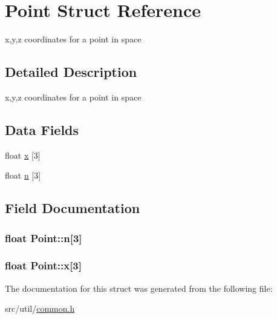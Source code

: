 \hypertarget{struct_point}{}\section{Point Struct Reference}
\label{struct_point}


x,y,z coordinates for a point in space  




\subsection{Detailed Description}
x,y,z coordinates for a point in space \subsection*{Data Fields}
\begin{DoxyCompactItemize}
\item 
float \hyperlink{struct_point_a59432b14c29b6596fc812ad6dc308137}{x} \mbox{[}3\mbox{]}
\item 
float \hyperlink{struct_point_a1e9f90253cb5724ee72043b9e3469d04}{n} \mbox{[}3\mbox{]}
\end{DoxyCompactItemize}


\subsection{Field Documentation}
\hypertarget{struct_point_a1e9f90253cb5724ee72043b9e3469d04}{}
\subsubsection[{n}]{\setlength{\rightskip}{0pt plus 5cm}float Point\+::n\mbox{[}3\mbox{]}}\label{struct_point_a1e9f90253cb5724ee72043b9e3469d04}
\hypertarget{struct_point_a59432b14c29b6596fc812ad6dc308137}{}
\subsubsection[{x}]{\setlength{\rightskip}{0pt plus 5cm}float Point\+::x\mbox{[}3\mbox{]}}\label{struct_point_a59432b14c29b6596fc812ad6dc308137}


The documentation for this struct was generated from the following file\+:\begin{DoxyCompactItemize}
\item 
src/util/\hyperlink{common_8h}{common.\+h}\end{DoxyCompactItemize}

